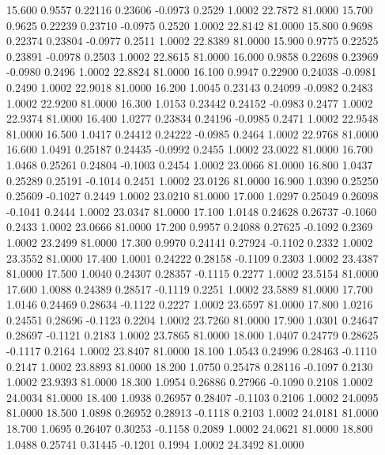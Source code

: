   15.600   0.9557   0.22116   0.23606  -0.0973   0.2529   1.0002  22.7872  81.0000
  15.700   0.9625   0.22239   0.23710  -0.0975   0.2520   1.0002  22.8142  81.0000
  15.800   0.9698   0.22374   0.23804  -0.0977   0.2511   1.0002  22.8389  81.0000
  15.900   0.9775   0.22525   0.23891  -0.0978   0.2503   1.0002  22.8615  81.0000
  16.000   0.9858   0.22698   0.23969  -0.0980   0.2496   1.0002  22.8824  81.0000
  16.100   0.9947   0.22900   0.24038  -0.0981   0.2490   1.0002  22.9018  81.0000
  16.200   1.0045   0.23143   0.24099  -0.0982   0.2483   1.0002  22.9200  81.0000
  16.300   1.0153   0.23442   0.24152  -0.0983   0.2477   1.0002  22.9374  81.0000
  16.400   1.0277   0.23834   0.24196  -0.0985   0.2471   1.0002  22.9548  81.0000
  16.500   1.0417   0.24412   0.24222  -0.0985   0.2464   1.0002  22.9768  81.0000
  16.600   1.0491   0.25187   0.24435  -0.0992   0.2455   1.0002  23.0022  81.0000
  16.700   1.0468   0.25261   0.24804  -0.1003   0.2454   1.0002  23.0066  81.0000
  16.800   1.0437   0.25289   0.25191  -0.1014   0.2451   1.0002  23.0126  81.0000
  16.900   1.0390   0.25250   0.25609  -0.1027   0.2449   1.0002  23.0210  81.0000
  17.000   1.0297   0.25049   0.26098  -0.1041   0.2444   1.0002  23.0347  81.0000
  17.100   1.0148   0.24628   0.26737  -0.1060   0.2433   1.0002  23.0666  81.0000
  17.200   0.9957   0.24088   0.27625  -0.1092   0.2369   1.0002  23.2499  81.0000
  17.300   0.9970   0.24141   0.27924  -0.1102   0.2332   1.0002  23.3552  81.0000
  17.400   1.0001   0.24222   0.28158  -0.1109   0.2303   1.0002  23.4387  81.0000
  17.500   1.0040   0.24307   0.28357  -0.1115   0.2277   1.0002  23.5154  81.0000
  17.600   1.0088   0.24389   0.28517  -0.1119   0.2251   1.0002  23.5889  81.0000
  17.700   1.0146   0.24469   0.28634  -0.1122   0.2227   1.0002  23.6597  81.0000
  17.800   1.0216   0.24551   0.28696  -0.1123   0.2204   1.0002  23.7260  81.0000
  17.900   1.0301   0.24647   0.28697  -0.1121   0.2183   1.0002  23.7865  81.0000
  18.000   1.0407   0.24779   0.28625  -0.1117   0.2164   1.0002  23.8407  81.0000
  18.100   1.0543   0.24996   0.28463  -0.1110   0.2147   1.0002  23.8893  81.0000
  18.200   1.0750   0.25478   0.28116  -0.1097   0.2130   1.0002  23.9393  81.0000
  18.300   1.0954   0.26886   0.27966  -0.1090   0.2108   1.0002  24.0034  81.0000
  18.400   1.0938   0.26957   0.28407  -0.1103   0.2106   1.0002  24.0095  81.0000
  18.500   1.0898   0.26952   0.28913  -0.1118   0.2103   1.0002  24.0181  81.0000
  18.700   1.0695   0.26407   0.30253  -0.1158   0.2089   1.0002  24.0621  81.0000
  18.800   1.0488   0.25741   0.31445  -0.1201   0.1994   1.0002  24.3492  81.0000
